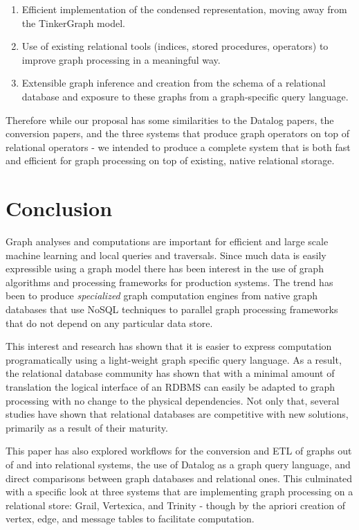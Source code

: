 \documentclass[11pt,letterpaper]{article}
\begin{document}
\begin{enumerate}
	\item Efficient implementation of the condensed representation, moving away from the TinkerGraph model.
	\item Use of existing relational tools (indices, stored procedures, operators) to improve graph processing in a meaningful way.
	\item Extensible graph inference and creation from the schema of a relational database and exposure to these graphs from a graph-specific query language.
\end{enumerate}

Therefore while our proposal has some similarities to the Datalog papers, the conversion papers, and the three systems that produce graph operators on top of relational operators - we intended to produce a complete system that is both fast and efficient for graph processing on top of existing, native relational storage.

\section*{Conclusion}

Graph analyses and computations are important for efficient and large scale machine learning and local queries and traversals. Since much data is easily expressible using a graph model there has been interest in the use of graph algorithms and processing frameworks for production systems. The trend has been to produce \textit{specialized} graph computation engines from native graph databases that use NoSQL techniques to parallel graph processing frameworks that do not depend on any particular data store.

This interest and research has shown that it is easier to express computation programatically using a light-weight graph specific query language. As a result, the relational database community has shown that with a minimal amount of translation the logical interface of an RDBMS can easily be adapted to graph processing with no change to the physical dependencies. Not only that, several studies have shown that relational databases are competitive with new solutions, primarily as a result of their maturity.

This paper has also explored workflows for the conversion and ETL of graphs out of and into relational systems, the use of Datalog as a graph query language, and direct comparisons between graph databases and relational ones. This culminated with a specific look at three systems that are implementing graph processing on a relational store: Grail, Vertexica, and Trinity - though by the apriori creation of vertex, edge, and message tables to facilitate computation.
\end{document}
